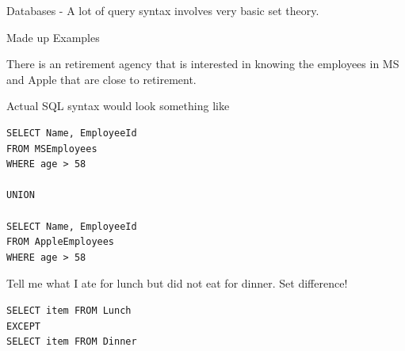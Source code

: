 \documentclass[12pt]{article}
\begin{document}
Databases - A lot of query syntax involves very basic set theory. 

Made up Examples

There is an retirement agency that is interested in knowing the employees in MS and Apple that are close to retirement. 

Actual SQL syntax would look something like

\begin{verbatim}
SELECT Name, EmployeeId
FROM MSEmployees
WHERE age > 58

UNION

SELECT Name, EmployeeId
FROM AppleEmployees
WHERE age > 58
\end{verbatim}

Tell me what I ate for lunch but did not eat for dinner. Set difference!

\begin{verbatim}
SELECT item FROM Lunch
EXCEPT
SELECT item FROM Dinner
\end{verbatim}
\end{document}
